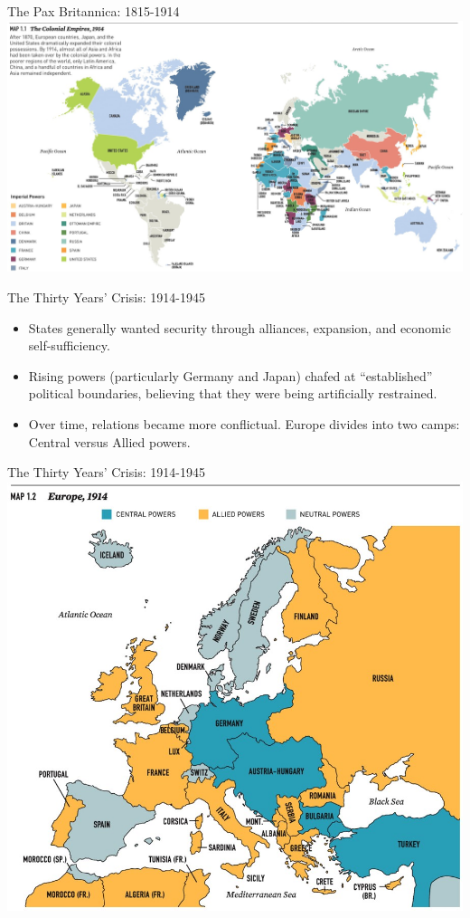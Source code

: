 \documentclass[handout]{beamer}
\begin{document}
\begin{frame}{\LARGE The Pax Britannica: 1815-1914}
	\centering
	\includegraphics[width=\textwidth,height=.9\textheight,keepaspectratio]{Colonialempires1914.jpg}	
\end{frame}

\begin{frame}{\LARGE The Thirty Years' Crisis: 1914-1945}
	\begin{itemize}
		\item States generally wanted security through alliances, expansion, and economic self-sufficiency. \pause
		\item Rising powers (particularly Germany and Japan) chafed at “established” political boundaries, believing that they were being artificially restrained. \pause
		\item Over time, relations became more conflictual.	Europe divides into two camps: Central versus Allied powers.		
	\end{itemize}
\end{frame}

\begin{frame}{\LARGE The Thirty Years' Crisis: 1914-1945}
	\centering
\includegraphics[width=\textwidth,height=.9\textheight,keepaspectratio]{CentralandAlliedpowers1914.jpg}
\end{frame}
\end{document}
